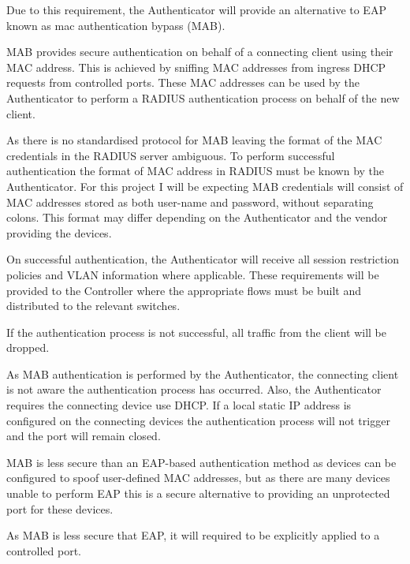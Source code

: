Due to this requirement, the Authenticator will provide an alternative to EAP known as mac authentication bypass (MAB). 

MAB provides secure authentication on behalf of a connecting client using their MAC address. This is achieved by sniffing MAC addresses from ingress DHCP requests from controlled ports. These MAC addresses can be used by the Authenticator to perform a RADIUS authentication process on behalf of the new client. \cite{junos_mab_switching}

As there is no standardised protocol for MAB leaving the format of the MAC credentials in the RADIUS server ambiguous. To perform successful authentication the format of MAC address in RADIUS must be known by the Authenticator. For this project I will be expecting MAB credentials will consist of MAC addresses stored as both user-name and password, without separating colons. This format may differ depending on the Authenticator and the vendor providing the devices.\cite{junos_mab_setup} \cite{hpe_mab_setup}

On successful authentication, the Authenticator will receive all session restriction policies and VLAN information where applicable. These requirements will be provided to the Controller where the appropriate flows must be built and distributed to the relevant switches.

If the authentication process is not successful, all traffic from the client will be dropped.

As MAB authentication is performed by the Authenticator, the connecting client is not aware the authentication process has occurred. Also, the Authenticator requires the connecting device use DHCP. If a local static IP address is configured on the connecting devices the authentication process will not trigger and the port will remain closed.

MAB is less secure than an EAP-based authentication method as devices can be configured to spoof user-defined MAC addresses, but as there are many devices unable to perform EAP this is a secure alternative to providing an unprotected port for these devices. 

As MAB is less secure that EAP, it will required to be explicitly applied to a controlled port.